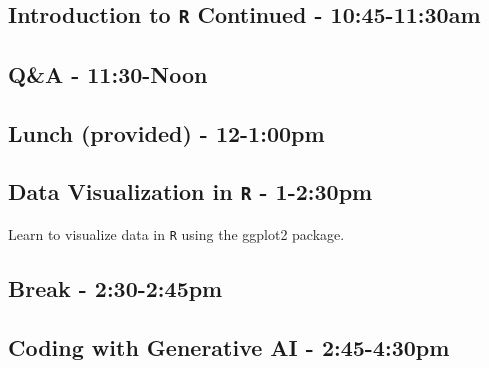 \documentclass[
  10pt,
  letterpaper,
  twoside,
  openright]{book}
\begin{document}
\hypertarget{introduction-to-r-continued---1045-1130am}{%
\subsection*{\texorpdfstring{Introduction to \texttt{R} Continued -
10:45-11:30am}{Introduction to R Continued - 10:45-11:30am}}\label{introduction-to-r-continued---1045-1130am}}

\hypertarget{qa---1130-noon}{%
\subsection*{Q\&A - 11:30-Noon}\label{qa---1130-noon}}

\hypertarget{lunch-provided---12-100pm}{%
\subsection*{Lunch (provided) -
12-1:00pm}\label{lunch-provided---12-100pm}}

\hypertarget{data-visualization-in-r---1-230pm}{%
\subsection*{\texorpdfstring{Data Visualization in \texttt{R} -
1-2:30pm}{Data Visualization in R - 1-2:30pm}}\label{data-visualization-in-r---1-230pm}}

Learn to visualize data in \texttt{R} using the ggplot2 package.

\hypertarget{break---230-245pm}{%
\subsection*{Break - 2:30-2:45pm}\label{break---230-245pm}}

\hypertarget{coding-with-generative-ai---245-430pm}{%
\subsection*{Coding with Generative AI -
2:45-4:30pm}\label{coding-with-generative-ai---245-430pm}}
\end{document}
